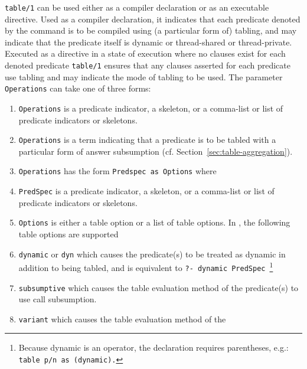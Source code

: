 \begin{description}


\label{table-declaration}
%
{\tt table/1} can be used either as a compiler declaration or as an
executable directive.  Used as a compiler declaration, it indicates
that each predicate denoted by the command is to be compiled using (a
particular form of) tabling, and may indicate that the predicate
itself is dynamic or thread-shared or thread-private.  Executed as a
directive in a state of execution where no clauses exist for each
denoted predicate {\tt table/1} ensures that any clauses asserted for
each predicate use tabling and may indicate the mode of tabling to be
used.  The parameter {\tt Operations} can take one of three forms:
%
\begin{enumerate}
\item {\tt Operations} is a predicate indicator, a skeleton, or
  a comma-list or list of predicate indicators or skeletons.
%
\item {\tt Operations} is a term indicating that a predicate is to be
  tabled with a particular form of answer subsumption
  (cf. Section~\ref{sec:table-aggregation}).
%
\item {\tt Operations} has the form {\tt Predspec as Options} where
\bi
\item {\tt PredSpec} is a predicate indicator, a skeleton, or a
  comma-list or list of predicate indicators or skeletons.
%
\item {\tt Options} is either a table option or a list of table
  options.  In \version, the following table options are supported
\bi
\item {\tt dynamic} or {\tt dyn} which causes the predicate(s) to be
  treated as dynamic in addition to being tabled, and is equivalent to
  {\tt ?- dynamic PredSpec}~\footnote{Because dynamic is an operator,
    the declaration requires parentheses, e.g.: {\tt table p/n as
      (dynamic).}}
%
\item {\tt subsumptive} which causes the table evaluation method of
  the predicate(s) to use call subsumption.
%
\item {\tt variant} which causes the table evaluation method of the

\end{enumerate}
\end{description}

